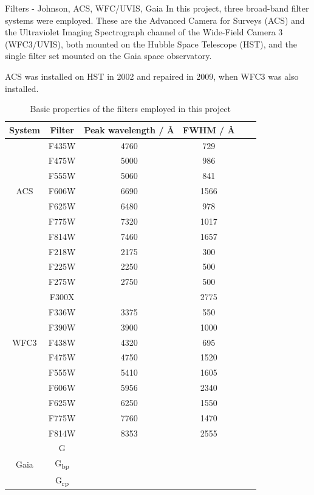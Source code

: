 \documentclass[12pt, a4paper]{report}
\begin{document}
Filters - Johnson, ACS, WFC/UVIS, Gaia
In this project, three broad-band filter systems were employed. These are the Advanced Camera for Surveys (ACS) and the Ultraviolet Imaging Spectrograph channel of the Wide-Field Camera 3 (WFC3/UVIS), both mounted on the Hubble Space Telescope (HST), and the single filter set mounted on the Gaia space observatory.

ACS was installed on HST in 2002 and repaired in 2009, when WFC3 was also installed.

\begin{table}
\begin{center}
\begin{tabular}{cccccc}
\hline
System & Filter & Peak wavelength / \AA & FWHM / \AA \\
\hline

& F435W & 4760 & 729 \\
& F475W & 5000 & 986 \\
& F555W & 5060 & 841 \\
ACS & F606W & 6690 & 1566 \\
& F625W & 6480 & 978 \\
& F775W & 7320 & 1017 \\
& F814W & 7460 & 1657 \\
\hline
& F218W & 2175 & 300 \\
& F225W & 2250 & 500 \\
& F275W & 2750 & 500 \\
& F300X &  & 2775 \\
& F336W & 3375 & 550 \\
& F390W & 3900 & 1000 \\
WFC3 & F438W & 4320 & 695 \\
& F475W & 4750 & 1520 \\
& F555W & 5410 & 1605 \\
& F606W & 5956 & 2340 \\
& F625W & 6250 & 1550 \\
& F775W & 7760 & 1470 \\
& F814W & 8353 & 2555 \\
\hline
& G &  &  \\
Gaia & G\textsubscript{bp} &  &  \\
& G\textsubscript{rp} &  &  \\
\hline

\end{tabular}
\caption{Basic properties of the filters employed in this project}
\label{filter_basics}
\end{center}
\end{table}
\end{document}
